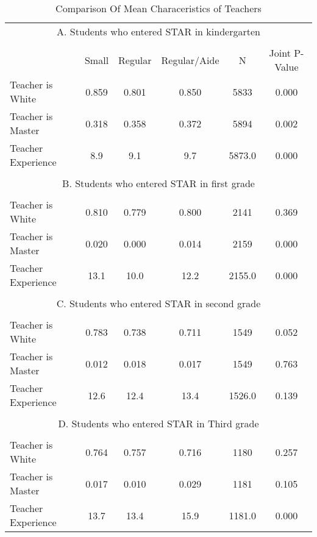 \documentclass{article}
\begin{document}
{{{{{%
\begin{table}[htbp]
  \centering
  \caption{Comparison Of Mean Characeristics of Teachers}
  \label{tab:sub5}
    \begin{tabular}{llccccc}
    \toprule
    \multicolumn{7}{c}{A. Students who entered STAR in kindergarten} \\
          &       &       &       &       &       &  \\
          &       & Small & Regular & Regular/Aide & N     & Joint P-Value \\
    \midrule
    \multicolumn{2}{l}{Teacher is White} & 0.859  & 0.801  & 0.850  & 5833  & 0.000  \\
    \multicolumn{2}{l}{Teacher is Master} & 0.318  & 0.358  & 0.372  & 5894  & 0.002  \\
    \multicolumn{2}{l}{Teacher Experience} & 8.9   & 9.1   & 9.7   & 5873.0  & 0.000  \\
          &       &       &       &       &       &  \\
    \multicolumn{7}{c}{B. Students who entered STAR in first grade} \\
    \multicolumn{2}{l}{} &       &       &       &       &  \\
    \multicolumn{2}{l}{Teacher is White} & 0.810  & 0.779  & 0.800  & 2141  & 0.369  \\
    \multicolumn{2}{l}{Teacher is Master} & 0.020  & 0.000  & 0.014  & 2159  & 0.000  \\
    \multicolumn{2}{l}{Teacher Experience} & 13.1  & 10.0  & 12.2  & 2155.0  & 0.000  \\
    \multicolumn{2}{l}{} &       &       &       &       &  \\
    \multicolumn{7}{c}{C. Students who entered STAR in second grade} \\
    \multicolumn{2}{l}{} &       &       &       &       &  \\
    \multicolumn{2}{l}{Teacher is White} & 0.783  & 0.738  & 0.711  & 1549  & 0.052  \\
    \multicolumn{2}{l}{Teacher is Master} & 0.012  & 0.018  & 0.017  & 1549  & 0.763  \\
    \multicolumn{2}{l}{Teacher Experience} & 12.6  & 12.4  & 13.4  & 1526.0  & 0.139  \\
    \multicolumn{2}{l}{} &       &       &       &       &  \\
    \multicolumn{7}{c}{D. Students who entered STAR in Third grade} \\
    \multicolumn{2}{l}{} &       &       &       &       &  \\
    \multicolumn{2}{l}{Teacher is White} & 0.764  & 0.757  & 0.716  & 1180  & 0.257  \\
    \multicolumn{2}{l}{Teacher is Master} & 0.017  & 0.010  & 0.029  & 1181  & 0.105  \\
    \multicolumn{2}{l}{Teacher Experience} & 13.7  & 13.4  & 15.9  & 1181.0  & 0.000  \\
    \bottomrule
    \bottomrule
    \end{tabular}%
  \label{tab:addlabel}%
\end{table}%

}}}}}
\end{document}
